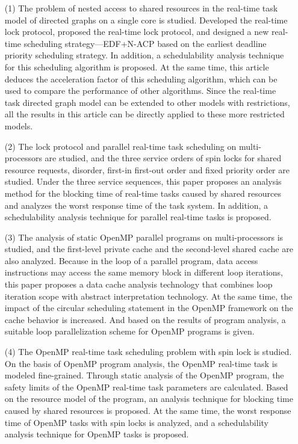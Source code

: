 \begin{itemize}
    \item [(1)] The problem of nested access to shared resources in the real-time task model of directed graphs on a single core is studied. Developed the real-time lock protocol, proposed the real-time lock protocol, and designed a new real-time scheduling strategy—EDF+N-ACP based on the earliest deadline priority scheduling strategy. In addition, a schedulability analysis technique for this scheduling algorithm is proposed. At the same time, this article deduces the acceleration factor of this scheduling algorithm, which can be used to compare the performance of other algorithms. Since the real-time task directed graph model can be extended to other models with restrictions, all the results in this article can be directly applied to these more restricted models.
    
    \item [(2)] The lock protocol and parallel real-time task scheduling on multi-processors are studied, and the three service orders of spin locks for shared resource requests, disorder, first-in first-out order and fixed priority order are studied. Under the three service sequences, this paper proposes an analysis method for the blocking time of real-time tasks caused by shared resources and analyzes the worst response time of the task system. In addition, a schedulability analysis technique for parallel real-time tasks is proposed.
    
    \item [(3)] The analysis of static OpenMP parallel programs on multi-processors is studied, and the first-level private cache and the second-level shared cache are also analyzed. Because in the loop of a parallel program, data access instructions may access the same memory block in different loop iterations, this paper proposes a data cache analysis technology that combines loop iteration scope with abstract interpretation technology. At the same time, the impact of the circular scheduling statement in the OpenMP framework on the cache behavior is increased. And based on the results of program analysis, a suitable loop parallelization scheme for OpenMP programs is given.
    
    \item [(4)] The OpenMP real-time task scheduling problem with spin lock is studied. On the basis of OpenMP program analysis, the OpenMP real-time task is modeled fine-grained. Through static analysis of the OpenMP program, the safety limits of the OpenMP real-time task parameters are calculated. Based on the resource model of the program, an analysis technique for blocking time caused by shared resources is proposed. At the same time, the worst response time of OpenMP tasks with spin locks is analyzed, and a schedulability analysis technique for OpenMP tasks is proposed.
\end{itemize}

